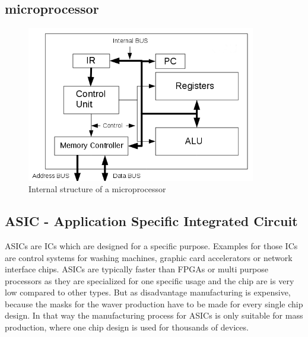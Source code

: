\subsection{microprocessor}
\begin{figure}[htbp]
\begin{center}
\includegraphics[width=10cm,keepaspectratio=true]{bilder/png/microprocessorblockdiagram}
\caption{Internal structure of a microprocessor}
\label{fig:microprocessorblockdiagram}
\end{center}
\end{figure}
\subsection{ASIC - Application Specific Integrated Circuit}
ASICs are ICs which are designed for a specific purpose. Examples for those ICs are control systems for washing machines, graphic card accelerators or network interface chips. ASICs are typically faster than FPGAs or multi purpose processors as they are specialized for one specific usage and the chip are is very low compared to other types. But as disadvantage manufacturing is expensive, because the masks for the waver production have to be made for every single chip design. In that way the manufacturing process for ASICs is only suitable for mass production, where one chip design is used for thousands of devices.
